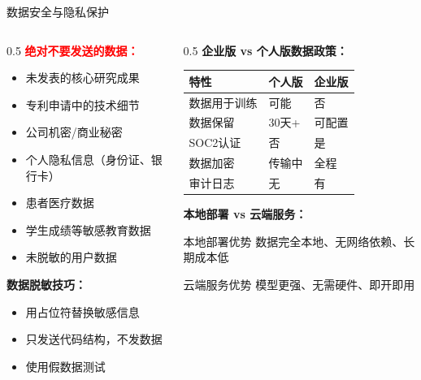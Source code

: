 \documentclass[aspectratio=169,11pt]{beamer}
\begin{document}
\begin{frame}{数据安全与隐私保护}
    \begin{columns}
        \begin{column}{0.5\textwidth}
            \textbf{\textcolor{red}{绝对不要发送的数据：}}
            \begin{itemize}
                \item[$\times$] 未发表的核心研究成果
                \item[$\times$] 专利申请中的技术细节
                \item[$\times$] 公司机密/商业秘密
                \item[$\times$] 个人隐私信息（身份证、银行卡）
                \item[$\times$] 患者医疗数据
                \item[$\times$] 学生成绩等敏感教育数据
                \item[$\times$] 未脱敏的用户数据
            \end{itemize}
            
            \vspace{0.3cm}
            \textbf{数据脱敏技巧：}
            \begin{itemize}
                \item 用占位符替换敏感信息
                \item 只发送代码结构，不发数据
                \item 使用假数据测试
            \end{itemize}
        \end{column}
        \begin{column}{0.5\textwidth}
            \textbf{企业版 vs 个人版数据政策：}
            \footnotesize
            \begin{tabular}{p{2cm}p{1.8cm}p{1.8cm}}
                \toprule
                \textbf{特性} & \textbf{个人版} & \textbf{企业版} \\
                \midrule
                数据用于训练 & 可能 & 否 \\
                数据保留 & 30天+ & 可配置 \\
                SOC2认证 & 否 & 是 \\
                数据加密 & 传输中 & 全程 \\
                审计日志 & 无 & 有 \\
                \bottomrule
            \end{tabular}
            \normalsize
            
            \vspace{0.3cm}
            \textbf{本地部署 vs 云端服务：}
            \begin{block}{本地部署优势}
                \small
                数据完全本地、无网络依赖、长期成本低
            \end{block}
            \begin{alertblock}{云端服务优势}
                \small
                模型更强、无需硬件、即开即用
            \end{alertblock}
        \end{column}
    \end{columns}
\end{frame}
\end{document}
